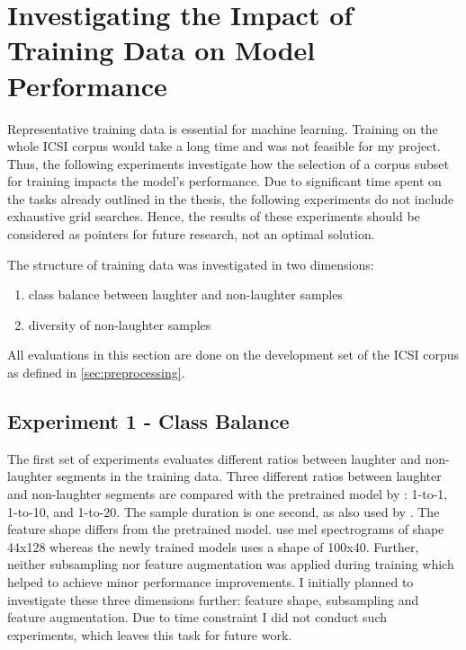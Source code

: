 \documentclass[bsc,frontabs,parskip,deptreport]{infthesis}
\begin{document}
\chapter{Investigating the Impact of Training Data on Model Performance} \label{cha:experiments}
Representative training data is essential for machine learning. Training on the whole ICSI corpus would take a long time and was not feasible for my project.
Thus, the following experiments investigate how the selection of a corpus subset for training impacts the model's performance. 
Due to significant time spent on the tasks already outlined in the thesis, the following experiments do not include exhaustive grid searches. Hence, the results of these experiments should be considered as pointers for future research, not an optimal solution.

The structure of training data was investigated in two dimensions: 
\begin{enumerate}
    \item class balance between laughter and non-laughter samples
    \item diversity of non-laughter samples 
\end{enumerate}

All evaluations in this section are done on the development set of the ICSI corpus as defined in \autoref{sec:preprocessing}.

\section{Experiment 1 - Class Balance} \label{sec:exp-1}
The first set of experiments evaluates different ratios between laughter and non-laughter segments in the training data.
Three different ratios between laughter and non-laughter segments are compared with the pretrained model by \citet{gillick2021robust}: 1-to-1, 1-to-10, and 1-to-20.
The sample duration is one second, as also used by \citet{gillick2021robust}. The feature shape differs from the pretrained model. \citet{gillick2021robust} use mel spectrograms of shape 44x128 whereas the newly trained models uses a shape of 100x40.
Further, neither subsampling nor feature augmentation was applied during training which helped \citet{gillick2021robust} to achieve minor performance improvements.
I initially planned to investigate these three dimensions further: feature shape, subsampling and feature augmentation. 
Due to time constraint I did not conduct such experiments, which leaves this task for future work. 
\end{document}
